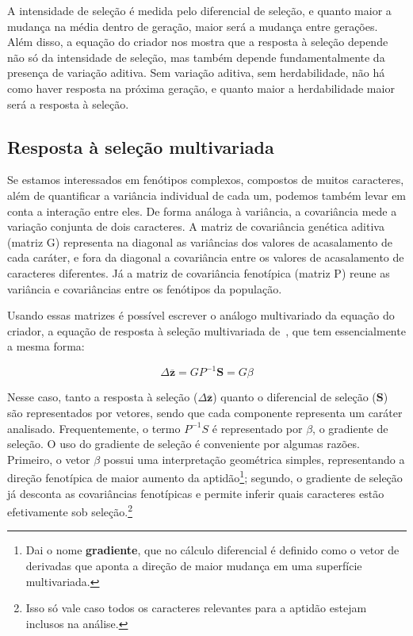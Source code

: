 \begin{refsection}
A intensidade de seleção é medida pelo diferencial de seleção, e quanto maior
a mudança na média dentro de geração, maior será a mudança entre gerações. Além
disso, a equação do criador nos mostra que a resposta à seleção depende não só
da intensidade de seleção, mas também depende fundamentalmente da presença de
variação aditiva. Sem variação aditiva, sem herdabilidade, não há como haver
resposta na próxima geração, e quanto maior a herdabilidade maior será a
resposta à seleção.

\subsection{Resposta à seleção multivariada}

Se estamos interessados em fenótipos complexos, compostos de muitos
caracteres, além de quantificar a variância individual de cada um, podemos
também levar em conta a interação entre eles. De forma análoga à variância, a
covariância mede a variação conjunta de dois caracteres. A matriz de
covariância genética aditiva (matriz G) representa na diagonal as variâncias
dos valores de acasalamento de cada caráter, e fora da diagonal a covariância
entre os valores de acasalamento de caracteres diferentes. Já a matriz de
covariância fenotípica (matriz P) reune as variância e covariâncias entre os
fenótipos da população.

Usando essas matrizes é possível escrever o análogo multivariado da equação do
criador, a equação de resposta à seleção multivariada de~\textcite{Lande1979-by}, que
tem essencialmente a mesma forma:

\begin{equation}
\Delta \mathbf{\overline z} = GP^{-1}\mathbf{S} = G\beta
\end{equation}

Nesse caso, tanto a resposta à seleção ($\Delta \mathbf{\overline z}$) quanto
o diferencial de seleção ($\mathbf{S}$) são representados por vetores, sendo
que cada componente representa um caráter analisado. Frequentemente, o termo
$P^{-1}S$ é representado por $\beta$, o gradiente de seleção. O uso do
gradiente de seleção é conveniente por algumas razões. Primeiro, o vetor
$\beta$ possui uma interpretação geométrica simples, representando a direção
fenotípica de maior aumento da aptidão\footnote{Dai o nome \textbf{gradiente},
que no cálculo diferencial é definido como o vetor de derivadas que aponta a
direção de maior mudança em uma superfície multivariada.}; segundo, o
gradiente de seleção já desconta as covariâncias fenotípicas e permite inferir
quais caracteres estão efetivamente sob seleção.\footnote{Isso só vale caso
todos os caracteres relevantes para a aptidão estejam inclusos na análise.}


\end{refsection}
